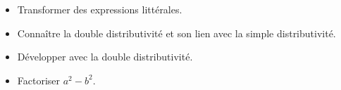 \begin{prerequis}[Objectifs de 3\up{e}]  
    \begin{itemize}  
        \item Transformer des expressions littérales.
        \item Connaître la double distributivité et son lien avec la simple distributivité.
        \item Développer avec la double distributivité.
        \item Factoriser $a^2-b^2$.
    \end{itemize}
\end{prerequis}